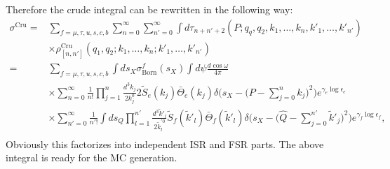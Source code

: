 Therefore the crude integral can be rewritten in the following way:
\begin{align}
\sigma^\text{Cru}=&\sum_{f=\mu,\tau,u,s,c,b}\sum_{n=0}^{\infty}\sum_{n'=0}^{\infty}\int d\tau_{n+n'+2}(P;q_q,q_2,k_1,\ldots,k_n,k'_1,\ldots,k'_{n'})\nonumber\\
&\times\rho^\text{Cru}_{[n,n']}(q_1,q_2;k_1,\ldots,k_n;k'_1,\ldots,k'_{n'})\nonumber\\
=&\sum_{f=\mu,\tau,u,s,c,b}\int ds_X\sigma_\text{Born}^f(s_X)\int d\psi \frac{d\cos\omega}{4\pi}\nonumber\\
&\times\sum_{n=0}^{\infty}\frac{1}{n!}\prod_{j=1}^{n}\frac{d^3k_j}{2k^0_j}2\widetilde{S}_e(k_j)\bar{\Theta}_e(k_j)\delta\biggl(s_X-\biggl(P-\sum_{j=0}^{n}k_j\biggr)^2\biggr)e^{\gamma_e\log\epsilon_e}\nonumber\\
&\times\sum_{n'=0}^{\infty}\frac{1}{n'!}\int ds_Q\prod_{l=1}^{n'}\frac{d^3\tilde{k}'_l}{2\tilde{k}_l^{'0}}\widetilde{S}_f(\tilde{k}'_l)\bar{\Theta}_f(\tilde{k}'_l) \delta\biggl(s_X-\biggl(\hat{Q}-\sum_{j=0}^{n'}\tilde{k}'_j\biggr)^2\biggr)e^{\gamma_f\log\epsilon_f},\nonumber\\
\end{align}
Obviously this factorizes into independent ISR and FSR parts. The above integral is ready for the MC generation.

